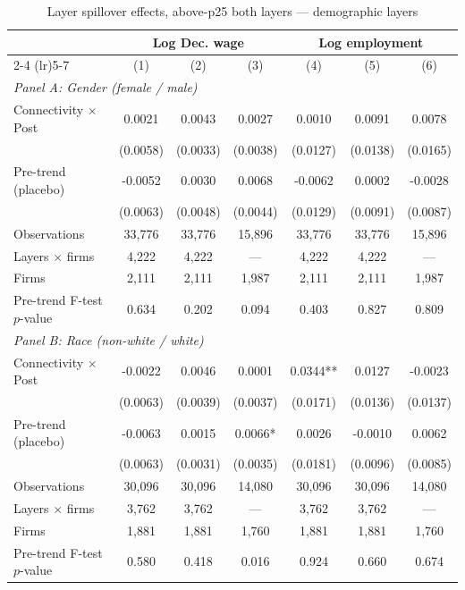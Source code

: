 \begin{table}[H]
\centering
\caption{Layer spillover effects, above-p25 both layers --- demographic layers}
\label{tab:layer_specs_abvp25_demog}
\scriptsize
\begin{threeparttable}
\begin{tabular}{lcccccc}
\toprule\toprule
 & \multicolumn{3}{c}{Log Dec. wage} & \multicolumn{3}{c}{Log employment} \\
\cmidrule(lr){2-4} \cmidrule(lr){5-7}
 & (1) & (2) & (3) & (4) & (5) & (6) \\
\midrule
\multicolumn{7}{l}{\textit{Panel A: Gender (female / male)}} \\
\quad Connectivity $\times$ Post & 0.0021 & 0.0043 & 0.0027 & 0.0010 & 0.0091 & 0.0078 \\
 & (0.0058) & (0.0033) & (0.0038) & (0.0127) & (0.0138) & (0.0165) \\
\quad Pre-trend (placebo) & -0.0052 & 0.0030 & 0.0068 & -0.0062 & 0.0002 & -0.0028 \\
 & (0.0063) & (0.0048) & (0.0044) & (0.0129) & (0.0091) & (0.0087) \\
\quad Observations & 33,776 & 33,776 & 15,896 & 33,776 & 33,776 & 15,896 \\
\quad Layers $\times$ firms & 4,222 & 4,222 & --- & 4,222 & 4,222 & --- \\
\quad Firms & 2,111 & 2,111 & 1,987 & 2,111 & 2,111 & 1,987 \\
\quad Pre-trend F-test $p$-value & 0.634 & 0.202 & 0.094 & 0.403 & 0.827 & 0.809 \\[6pt]
\multicolumn{7}{l}{\textit{Panel B: Race (non-white / white)}} \\
\quad Connectivity $\times$ Post & -0.0022 & 0.0046 & 0.0001 & 0.0344** & 0.0127 & -0.0023 \\
 & (0.0063) & (0.0039) & (0.0037) & (0.0171) & (0.0136) & (0.0137) \\
\quad Pre-trend (placebo) & -0.0063 & 0.0015 & 0.0066* & 0.0026 & -0.0010 & 0.0062 \\
 & (0.0063) & (0.0031) & (0.0035) & (0.0181) & (0.0096) & (0.0085) \\
\quad Observations & 30,096 & 30,096 & 14,080 & 30,096 & 30,096 & 14,080 \\
\quad Layers $\times$ firms & 3,762 & 3,762 & --- & 3,762 & 3,762 & --- \\
\quad Firms & 1,881 & 1,881 & 1,760 & 1,881 & 1,881 & 1,760 \\
\quad Pre-trend F-test $p$-value & 0.580 & 0.418 & 0.016 & 0.924 & 0.660 & 0.674 \\

\end{tabular}
\end{threeparttable}
\end{table}
